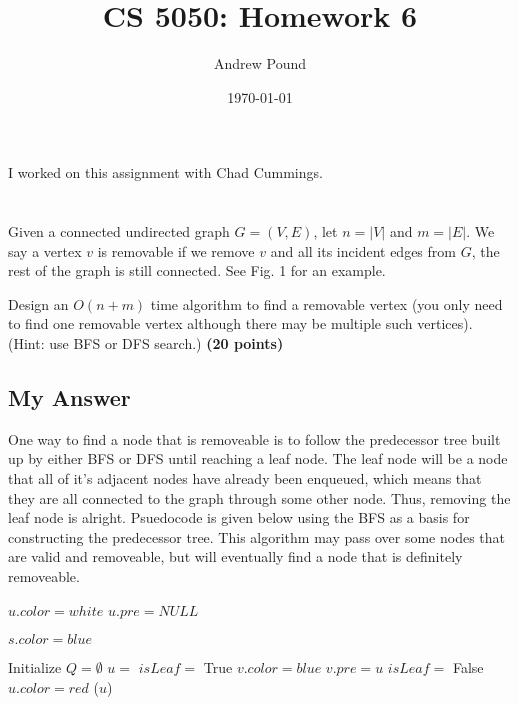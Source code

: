 \documentclass{article}
\title{CS 5050: Homework 6}
\author{Andrew Pound}
\date{\today}
\begin{document}
\maketitle

I worked on this assignment with Chad Cummings.
\section{}%
 Given a connected undirected graph $G = (V,E)$, let $n = |V |$ and $m
 = |E|$. We say a vertex $v$ is removable if we remove $v$ and all its
 incident edges from $G$, the rest of the graph is still connected. See Fig. 1 for an example.

Design an $O(n + m)$ time algorithm to find a removable vertex (you only need to find one
removable vertex although there may be multiple such vertices). (Hint: use BFS or DFS
search.) {\bf (20 points)}

\subsection{My Answer}
One way to find a node that is removeable is to follow the predecessor
tree built up by either BFS or DFS until reaching a leaf node.  The
leaf node will be a node that all of it's adjacent nodes have already
been enqueued, which means that they are all connected to the graph
through some other node.  Thus, removing the leaf node is alright. 
Psuedocode is given below using the BFS as a basis for constructing
the predecessor tree. This algorithm may pass over some nodes that are
valid and removeable, but will eventually find a node that is
definitely removeable.

{\singlespacing
\begin{algorithmic}
      \State $u.color  = white$
      \State $u.pre = NULL$
    \EndFor
    
    \State $s.color = blue$
    
    \State Initialize $Q = \emptyset$
    \State {}
      \State $u = $ 
      \State $isLeaf =$ True
          \State $v.color = blue$
          \State {}
          \State $v.pre = u$
          \State $isLeaf =$ False
        \EndIf
      \EndFor
      \State $u.color = red$
        ($u$)
      \EndIf
    \EndWhile
\EndFunction    
\end{algorithmic}
}
\end{document}
